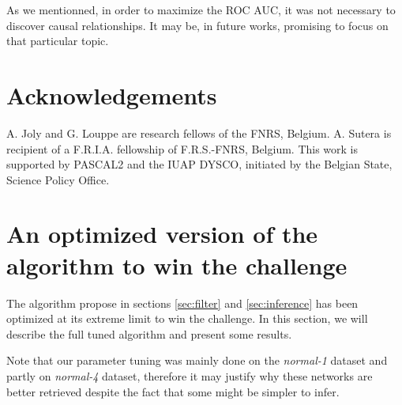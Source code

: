 \documentclass[wcp]{jmlr}
\begin{document}
As we mentionned, in order to maximize the ROC AUC, it was not necessary to
discover causal relationships. It may be, in future works, promising to focus
on that particular topic.


\section*{Acknowledgements}
A. Joly and G. Louppe are research fellows of
the FNRS, Belgium.  A. Sutera is recipient of
a F.R.I.A. fellowship of F.R.S.-FNRS, Belgium.
This work is supported by PASCAL2 and the IUAP DYSCO, initiated by the
Belgian State, Science Policy Office.



\newpage
\clearpage



\newpage
\clearpage

\appendix


\section{An optimized version of the algorithm to win the challenge}
\label{app:optimized}


The algorithm propose in sections \ref{sec:filter} and \ref{sec:inference} has been optimized at its extreme limit to win the challenge. In this section, we will describe the full tuned algorithm and present some results.

Note that our parameter tuning was mainly
done on the \textit{normal-1} dataset and partly on \textit{normal-4} dataset,
therefore it may justify why these networks are better retrieved despite the
fact that some might be simpler to infer.
\end{document}
